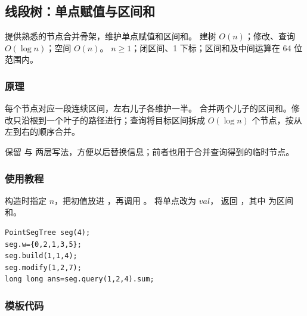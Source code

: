\subsection{线段树：单点赋值与区间和}
\label{ds:seg-point}
\AlgorithmInfo
    {提供熟悉的节点合并骨架，维护单点赋值和区间和。}
    {建树 $O(n)$；修改、查询 $O(\log n)$；空间 $O(n)$。}
    {$n\ge1$；闭区间、1 下标；区间和及中间运算在 64 位范围内。}
\subsubsection*{原理}
每个节点对应一段连续区间，左右儿子各维护一半。 合并两个儿子的区间和。修改只沿根到一个叶子的路径进行；查询将目标区间拆成 $O(\log n)$ 个节点，按从左到右的顺序合并。

保留  与  两层写法，方便以后替换信息；前者也用于合并查询得到的临时节点。

\subsubsection*{使用教程}
构造时指定 $n$，把初值放进 ，再调用 。 将单点改为 $val$， 返回 ，其中  为区间和。
\begin{lstlisting}[style=mtycpp,numbers=none]
PointSegTree seg(4);
seg.w={0,2,1,3,5};
seg.build(1,1,4);
seg.modify(1,2,7);
long long ans=seg.query(1,2,4).sum;
\end{lstlisting}
\subsubsection*{模板代码}
